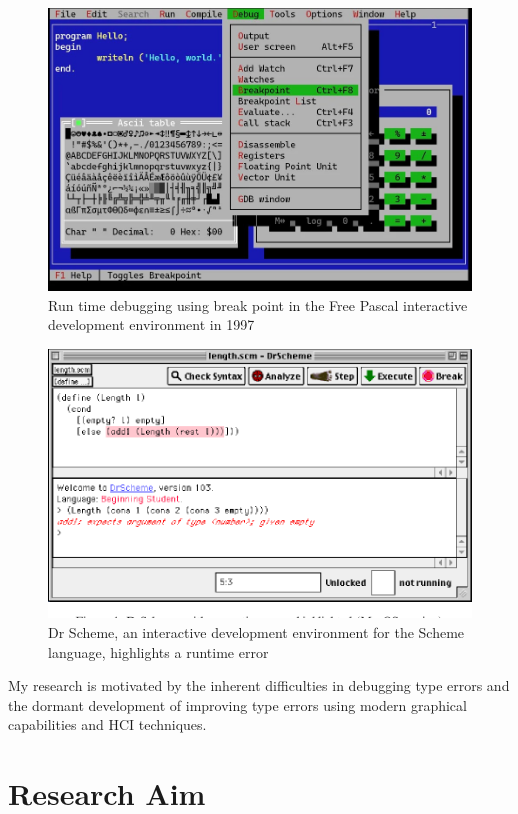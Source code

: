 \begin{figure}[hbt]
  \includegraphics[width=\linewidth]{FreePascal.jpg}
  \caption{
    Run time debugging using break point in the Free Pascal interactive development environment in 1997
    }
\end{figure}

\begin{figure}[hbt]
  \includegraphics[width=\linewidth]{DrScheme}
  \caption{
    Dr Scheme, an interactive development environment for the Scheme language, highlights a runtime error
    }
\end{figure}

My research is motivated by the inherent difficulties in debugging type errors and the dormant development of improving type errors using modern graphical capabilities and HCI techniques.

\section{Research Aim}

